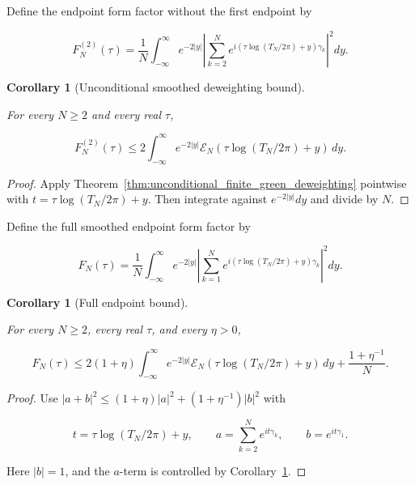 \documentclass[11pt]{amsart}
\numberwithin{equation}{section}
\theoremstyle{plain}
\newtheorem{corollary}[theorem]{Corollary}
\theoremstyle{definition}
\theoremstyle{remark}
\begin{document}
Define the endpoint form factor without the first endpoint by

\begin{equation}
F_N^{(2)}(\tau)
=
\frac1N
\int_{-\infty}^{\infty}
e^{-2|y|}
\left|
\sum_{k=2}^{N}
e^{i(\tau\log(T_N/2\pi)+y)\gamma_k}
\right|^2dy.
\label{eq:smoothed_endpoint_form_factor_without_first}
\end{equation}

\begin{corollary}[Unconditional smoothed deweighting bound]
\label{cor:unconditional_smoothed_deweighting_bound}

For every \(N\ge2\) and every real \(\tau\),

\begin{equation}
F_N^{(2)}(\tau)
\le
2
\int_{-\infty}^{\infty}
e^{-2|y|}
\mathcal E_N(\tau\log(T_N/2\pi)+y)\,dy.
\label{eq:smoothed_deweighting_bound_without_first}
\end{equation}

\end{corollary}

\begin{proof}
Apply Theorem~\ref{thm:unconditional_finite_green_deweighting}
pointwise with \(t=\tau\log(T_N/2\pi)+y\). Then integrate against
\(e^{-2|y|}dy\) and divide by \(N\).
\end{proof}

Define the full smoothed endpoint form factor by

\begin{equation}
F_N(\tau)
=
\frac1N
\int_{-\infty}^{\infty}
e^{-2|y|}
\left|
\sum_{k=1}^{N}
e^{i(\tau\log(T_N/2\pi)+y)\gamma_k}
\right|^2dy.
\label{eq:smoothed_form_factor_integral}
\end{equation}

\begin{corollary}[Full endpoint bound]
\label{cor:full_endpoint_bound}

For every \(N\ge2\), every real \(\tau\), and every \(\eta>0\),

\begin{equation}
F_N(\tau)
\le
2(1+\eta)
\int_{-\infty}^{\infty}
e^{-2|y|}
\mathcal E_N(\tau\log(T_N/2\pi)+y)\,dy
+
\frac{1+\eta^{-1}}{N}.
\label{eq:full_endpoint_deweighting_bound}
\end{equation}

\end{corollary}

\begin{proof}
Use
\(|a+b|^2\le (1+\eta)|a|^2+(1+\eta^{-1})|b|^2\) with

\begin{equation}
t=\tau\log(T_N/2\pi)+y,
\qquad
a=\sum_{k=2}^{N}e^{it\gamma_k},
\qquad
b=e^{it\gamma_1}.
\end{equation}

Here \(|b|=1\), and the \(a\)-term is controlled by
Corollary~\ref{cor:unconditional_smoothed_deweighting_bound}.
\end{proof}
\end{document}
